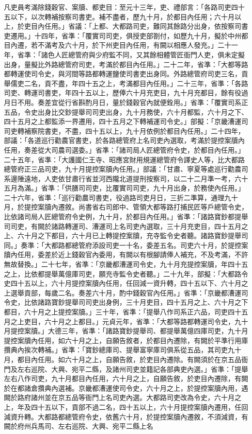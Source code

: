 \begin{pinyinscope}
 凡吏員考滿除錢穀官、案牘、都吏目：至元十三年，吏、禮部言：「各路司吏四十五以下，以次轉補按察司書吏。補不盡者，歷九十月，於都目內任用；六十月以上，於吏目內任用。」省議：「上都、大都路司吏，難同其餘路分出身，依按察司書吏遷用。」十四年，省準：「覆實司司吏，俱授吏部劄付，如歷九十月，擬於中州都目內遷，若不滿考及六十月，於下州吏目內任用，有闕以相應人發充。」二十一年，省準：「諸色人匠總管府與少府監不同，又其餘相體管匠衙門人吏，俱未定擬出身，量擬比外路總管府司吏，考滿於都目內任用。」二十二年，省準：「大都等路都轉運使司令史，與河間等路都轉運鹽使司書吏出身同。外路總管府司吏三名，貢舉儒吏二名，貢不盡，年四十五之上，考滿都目內任用。」二十三年，省準：「各路司吏、轉運司書吏，年四十五以上，歷俸六十月充吏目，九十月充都目，餘有役過月日不用。奏差宜從行省斟酌月日，量於錢穀官內就便銓用。」省準：「覆實司系正五品，令史出身比交鈔提舉司司吏出身，九十月務使，六十月都監，六十月之下、四十五月之上都監添一界遷用，四十五月之下轉補運司令史。」部擬：「京畿漕運司司吏轉補察院書吏，不盡，四十五以上，九十月依例於都目內任用。」二十四年，部議：「各道巡行勸農官書吏，於各路總管府上名司吏內選取，考滿於提控案牘內任用，奏差從大司農司選委。」省準：「諸司局人匠總管府令史，於都目內任用。」二十五年，省準：「大護國仁王寺、昭應宮財用規運總管府令譯史人等，比大都路總管府正三品司吏，九十月提控案牘內任用。」部議：「甘肅、寧夏等處巡行勸農司系邊陲遠地，人吏依甘肅行省並河西隴北道提刑按察司，以二十二月準一考，六十五月為滿。」省準：「供膳司司吏，比覆實司司吏，九十月出身，於務使內任用。」二十六年，省準：「巡行勸農司書吏，役過路司吏月日，三折二準算，通理九十月，於提控案牘內遷敘。尚書省右司郎中、管領大都等路打捕民匠等戶總管令史，比依諸司局人匠總管府令史例，九十月，於都目內任用。」省準：「諸路寶鈔都提舉司司吏，有闕於諸路轉運司、漕運司上名司吏內選取，三十月充吏目，四十五月之上、六十月之下都目，六十月已上轉提控案牘，充寺監令史者聽。諸路寶鈔提舉司同。」奏準：「大都路都總管府添設司吏一十名，委差五名。司吏六十月，於提控案牘內任用，委差於近上錢穀官內委用，有闕以有根腳請俸人補充，不及考滿，不許無故替換。」二十七年，省準：「京畿都漕運司令史，九十月充提控案牘，年四十五之上，比依都提舉萬億庫司吏，願充寺監令史者聽。」二十九年，部擬：「大都路令史四十五以上，六十月提控案牘內任用，任回減一資升轉，四十五以下、六十月之上選舉貢部，每歲二名。奏差六十月，酌中錢穀官內任用。」省準：「京畿都漕運司令史，比依諸路寶鈔提舉司司吏出身例，三十月吏目，四十五月之上、六十月之下都目，六十月之上提控案牘。」三十年，省準：「提舉八作司系正六品，司吏四十五月之上吏目，六十月之上都目。」元貞元年，省準：「大都等路都轉運司令史，九十月提控案牘。」大德三年，省準：「諸路寶鈔提舉司、都提舉萬億四庫司吏，九十月提控案牘內任用，如六十月之上，自願告敘者，於都目內遷除，有闕於平準行用庫攢典內挨次轉補。」省準：「寶鈔總庫司、提舉富寧庫司俱系從五品，其司吏九十月，都目內任用。如六十月之上，自願告敘，於吏目內遷除。有闕須於在京五品衙門及左右巡院、大興、宛平二縣，及諸州司吏並籍記各部典吏內選。」省準：「提舉左右八作司吏，九十月都目內任用，六十月之上，自願告敘，於吏目內遷除，有闕於在都諸倉攢典內選補。京畿都漕運使司令史，六十月之上，於提控案牘內用，遇闕於路府諸州並在京五品等衙門上名司吏內選。大都路司吏改為令史，六十月之上，年及四十五以下，貢部不過二名，四十五以上，六十月提控案牘內遷用，任回減資升轉。大都路都總管府令史，依舊六十月，於提控案牘內遷敘，不須減資，有闕於府州兵馬司、左右巡院、大興、宛平二縣上名
\end{pinyinscope}
